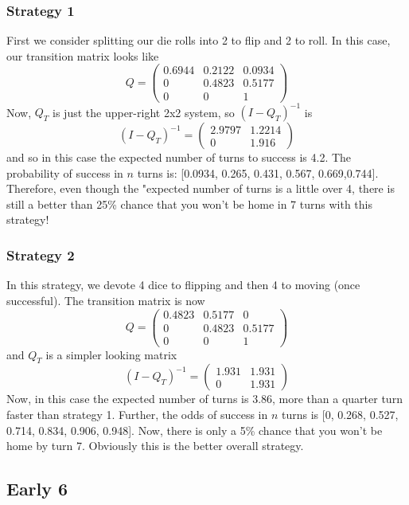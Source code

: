\documentclass[letterpaper,11pt]{article}
\begin{document}
\subsubsection{Strategy 1}
First we consider splitting our die rolls into 2 to flip and 2 to roll.  In
this case, our transition matrix looks like 
\[
   Q = \left(\begin{array}{ccc}
      0.6944 & 0.2122 & 0.0934 \\
      0 & 0.4823 & 0.5177 \\
      0 & 0 & 1
      \end{array} \right)
\]
Now, $Q_T$ is just the upper-right 2x2 system, so $(I-Q_T)^{-1}$ is 
\[
   (I-Q_T)^{-1} = \left(\begin{array}{cc}
     2.9797 & 1.2214 \\
     0 & 1.916
   \end{array} \right)
\]
and so in this case the expected number of turns to success is 4.2.  The
probability of success in $n$ turns is: [0.0934, 0.265, 0.431, 0.567,
0.669,0.744].  Therefore, even though the "expected number of turns is a little
over 4, there is still a better than 25\% chance that you won't be home in 7
turns with this strategy!

\subsubsection{Strategy 2}
In this strategy, we devote 4 dice to flipping and then 4 to moving (once
successful).  The transition matrix is now
\[
   Q = \left(\begin{array}{ccc}
      0.4823 & 0.5177 & 0 \\
      0 & 0.4823 & 0.5177 \\
      0 & 0 & 1
      \end{array} \right)
\]
and $Q_T$ is a simpler looking matrix
\[
   (I-Q_T)^{-1} = \left(\begin{array}{cc}
     1.931 & 1.931 \\
     0 & 1.931
   \end{array} \right)
\]
Now, in this case the expected number of turns is 3.86, more than a quarter
turn faster than strategy 1.  Further, the odds of success in $n$ turns is
[0, 0.268, 0.527, 0.714, 0.834, 0.906, 0.948].  Now, there is only a 5\%
chance that you won't be home by turn 7.  Obviously this is the better
overall strategy.

\subsection{Early 6}
\end{document}
